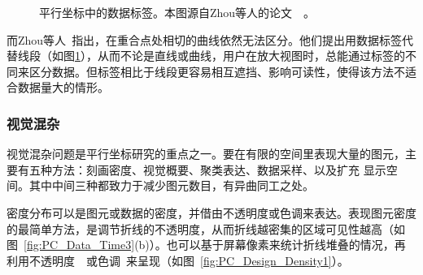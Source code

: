 \documentclass[12pt,twocolumn]{article}
\begin{document}
\begin{figure}[!htb]
\centering
{}
\caption{\label{fig:PC_Design_Label}平行坐标中的数据标签。本图源自Zhou等人的论文~\citep{zhou2014parallel}~。}
\end{figure}

而Zhou等人~\citep{zhou2014parallel}指出，在重合点处相切的曲线依然无法区分。他们提出用数据标签代替线段（如图\ref{fig:PC_Design_Label}），从而不论是直线或曲线，用户在放大视图时，总能通过标签的不同来区分数据。但标签相比于线段更容易相互遮挡、影响可读性，使得该方法不适合数据量大的情形。

\subsubsection{视觉混杂}

视觉混杂问题是平行坐标研究的重点之一。要在有限的空间里表现大量的图元，主要有五种方法：刻画密度、视觉概要、聚类表达、数据采样、以及扩充
显示空间。其中中间三种都致力于减少图元数目，有异曲同工之处。

密度分布可以是图元或数据的密度，并借由不透明度或色调来表达。表现图元密度的最简单方法，是调节折线的不透明度，从而折线越密集的区域可见性越高（如图~\ref{fig:PC_Data_Time3}(b)）。也可以基于屏幕像素来统计折线堆叠的情况，再利用不透明度~\citep{artero2004uncovering}~\citep{johansson2007depth}或色调~\citep{mcdonnell2008illustrative}来呈现（如图~\ref{fig:PC_Design_Density1}）。
\end{document}
